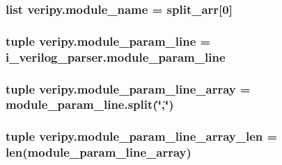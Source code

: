 \hypertarget{namespaceveripy_a6cf4d136450ca28b0d58dc5317ba74eb}{
\subsubsection[{module\-\_\-name}]{\setlength{\rightskip}{0pt plus 5cm}list veripy.\-module\-\_\-name = {\bf split\-\_\-arr}\mbox{[}0\mbox{]}}}\label{namespaceveripy_a6cf4d136450ca28b0d58dc5317ba74eb}
\hypertarget{namespaceveripy_ad28afa9505ad0efeb718337fc56e525b}{
\subsubsection[{module\-\_\-param\-\_\-line}]{\setlength{\rightskip}{0pt plus 5cm}tuple veripy.\-module\-\_\-param\-\_\-line = i\-\_\-verilog\-\_\-parser.\-module\-\_\-param\-\_\-line}}\label{namespaceveripy_ad28afa9505ad0efeb718337fc56e525b}
\hypertarget{namespaceveripy_aee8dfa1620d81a57b55d941b6bc353e9}{
\subsubsection[{module\-\_\-param\-\_\-line\-\_\-array}]{\setlength{\rightskip}{0pt plus 5cm}tuple veripy.\-module\-\_\-param\-\_\-line\-\_\-array = module\-\_\-param\-\_\-line.\-split(\char`\"{},\char`\"{})}}\label{namespaceveripy_aee8dfa1620d81a57b55d941b6bc353e9}
\hypertarget{namespaceveripy_a7dd3d81c188bf962f2192d44030c6c2f}{
\subsubsection[{module\-\_\-param\-\_\-line\-\_\-array\-\_\-len}]{\setlength{\rightskip}{0pt plus 5cm}tuple veripy.\-module\-\_\-param\-\_\-line\-\_\-array\-\_\-len = len({\bf module\-\_\-param\-\_\-line\-\_\-array})}}\label{namespaceveripy_a7dd3d81c188bf962f2192d44030c6c2f}
